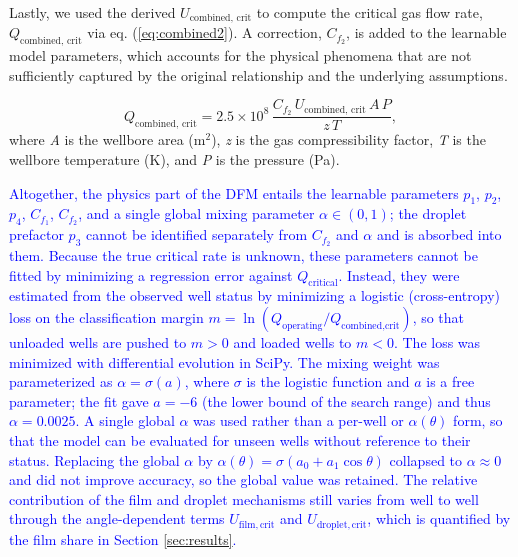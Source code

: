 \documentclass[journal=jacsat,manuscript=article]{achemso}
\newcommand{\al}{\textcolor{blue}}
\theoremstyle{thmstyleone}%
\theoremstyle{thmstyletwo}%
\theoremstyle{thmstylethree}%
\begin{document}
Lastly, we used the derived $U_{\mathrm{combined,\,crit}}$ to compute the critical gas flow rate, $Q_{\mathrm{combined,\,crit}} $ via eq. (\ref{eq:combined2}).  A correction, $C_{f_2}$, is added to the learnable model parameters, which accounts for the physical phenomena that are not sufficiently captured by the original relationship and the underlying assumptions. 

\begin{equation}
Q_{\mathrm{combined,\,crit}} 
= 2.5 \times 10^{8}\,
\frac{C_{f_2}\, U_{\mathrm{combined,\,crit}}\, A\, P}
{z\, T},
\label{eq:combined2}
\end{equation}
where \textit{A} is the wellbore area (m$^2$), \textit{z} is the gas compressibility factor, \textit{T} is the wellbore temperature (K), and \textit{P} is the pressure (Pa).

\al{Altogether, the physics part of the DFM entails the learnable parameters $p_1$, $p_2$, $p_4$, $C_{f_1}$, $C_{f_2}$, and a single global mixing parameter $\alpha \in (0,1)$; the droplet prefactor $p_3$ cannot be identified separately from $C_{f_2}$ and $\alpha$ and is absorbed into them. Because the true critical rate is unknown, these parameters cannot be fitted by minimizing a regression error against $Q_{\text{critical}}$. Instead, they were estimated from the observed well status by minimizing a logistic (cross-entropy) loss on the classification margin $m = \ln(Q_{\text{operating}}/Q_{\text{combined,crit}})$, so that unloaded wells are pushed to $m>0$ and loaded wells to $m<0$. The loss was minimized with differential evolution in SciPy. The mixing weight was parameterized as $\alpha = \sigma(a)$, where $\sigma$ is the logistic function and $a$ is a free parameter; the fit gave $a = -6$ (the lower bound of the search range) and thus $\alpha = 0.0025$. A single global $\alpha$ was used rather than a per-well or $\alpha(\theta)$ form, so that the model can be evaluated for unseen wells without reference to their status. Replacing the global $\alpha$ by $\alpha(\theta) = \sigma(a_0 + a_1\cos\theta)$ collapsed to $\alpha \approx 0$ and did not improve accuracy, so the global value was retained. The relative contribution of the film and droplet mechanisms still varies from well to well through the angle-dependent terms $U_{\mathrm{film,crit}}$ and $U_{\mathrm{droplet,crit}}$, which is quantified by the film share in Section \ref{sec:results}.}
\end{document}
